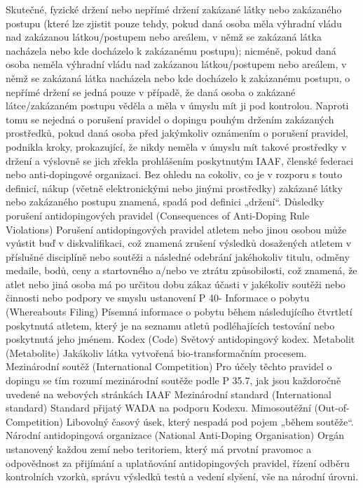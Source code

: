 \dd Skutečné, fyzické držení nebo nepřímé držení zakázané látky nebo zakázaného postupu (které lze zjistit pouze tehdy, pokud daná osoba měla výhradní vládu nad zakázanou látkou/postupem nebo areálem, v němž se zakázaná látka nacházela nebo kde docházelo k zakázanému postupu);  nicméně, pokud daná osoba neměla výhradní vládu nad zakázanou látkou/postupem nebo areálem, v němž se zakázaná látka nacházela nebo kde docházelo k zakázanému postupu, o nepřímé držení se jedná pouze v případě, že daná osoba o zakázané látce/zakázaném postupu věděla a měla v úmyslu mít ji pod kontrolou. Naproti tomu se nejedná o porušení pravidel o dopingu pouhým držením zakázaných prostředků, pokud daná osoba před jakýmkoliv oznámením o porušení pravidel, podnikla kroky, prokazující, že nikdy neměla v úmyslu mít takové prostředky v držení a výslovně se jich zřekla prohlášením poskytnutým IAAF, členské federaci nebo anti-dopingové organizaci. Bez ohledu na cokoliv, co je v rozporu s touto definicí, nákup (včetně elektronickými nebo jinými prostředky) zakázané látky nebo zakázaného postupu znamená, spadá pod definici „držení“.
\dend
\dt Důsledky porušení antidopingových pravidel (Consequences of Anti-Doping Rule Violations)
\dd Porušení antidopingových pravidel atletem nebo jinou osobou může vyústit buď v diskvalifikaci, což znamená zrušení výsledků dosažených atletem v příslušné disciplíně nebo soutěži a následné odebrání jakéhokoliv titulu, odměny medaile, bodů, ceny a startovného a/nebo ve ztrátu způsobilosti, což znamená, že atlet nebo jiná osoba má po určitou dobu zákaz účasti v jakékoliv soutěži nebo činnosti nebo podpory ve smyslu ustanovení P 40-
\dend
\dt Informace o pobytu (Whereabouts Filing)
\dd Písemná informace o pobytu během následujícího čtvrtletí poskytnutá atletem, který je na seznamu atletů podléhajících testování nebo poskytnutá jeho jménem.
\dend
\dt Kodex (Code)
\dd Světový antidopingový kodex.
\dend
\dt Metabolit (Metabolite)
\dd Jakákoliv látka vytvořená bio-transformačním procesem.
\dend
\dt Mezinárodní soutěž (International Competition)
\dd Pro účely těchto pravidel o dopingu se tím rozumí mezinárodní soutěže podle P 35.7, jak jsou každoročně uvedené na webových stránkách IAAF
\dend
\dt Mezinárodní standard  (International standard)
\dd Standard přijatý WADA na podporu Kodexu.
\dend
\dt Mimosoutěžní (Out-of-Competition)
\dd Libovolný časový úsek, který nespadá pod pojem „během soutěže“.
\dend
\dt Národní antidopingová organizace (National Anti-Doping Organisation)
\dd Orgán ustanovený každou zemí nebo teritoriem, který má prvotní pravomoc a odpovědnost za přijímání a uplatňování antidopingových pravidel, řízení odběru kontrolních vzorků, správu výsledků testů a vedení slyšení, vše na národní úrovni.
